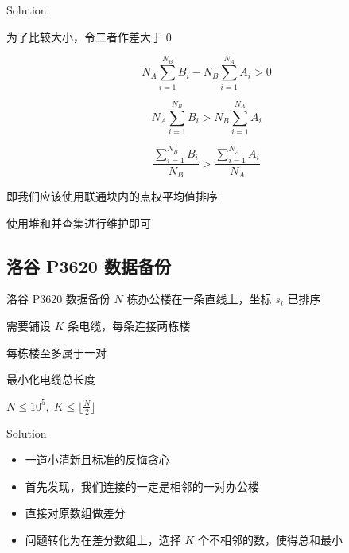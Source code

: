 ﻿\documentclass[aspectratio=169,handout]{ctexbeamer}
\begin{document}
\begin{frame}{Solution}
    

    为了比较大小，令二者作差大于 $ 0 $ 

    $$
        N_A\sum_{i=1}^{N_B}{B_i}-N_B\sum_{i=1}^{N_A}{A_i}>0
    $$

    $$
        N_A\sum_{i=1}^{N_B}{B_i}>N_B\sum_{i=1}^{N_A}{A_i} 
    $$

    $$
        \frac{\sum_{i=1}^{N_B}{B_i}}{N_B}>\frac{\sum_{i=1}^{N_A}{A_i}}{N_A}
    $$

    即我们应该使用联通块内的点权平均值排序

    使用堆和并查集进行维护即可

\end{frame}































\subsection{洛谷 P3620 数据备份}
\begin{frame}{洛谷 P3620 数据备份}
    $N$ 栋办公楼在一条直线上，坐标 $s_i$ 已排序

需要铺设 $K$ 条电缆，每条连接两栋楼

每栋楼至多属于一对

最小化电缆总长度

$N\leq 10^5,\; K\le\lfloor\frac{N}{2}\rfloor$
\end{frame}

\begin{frame}{Solution}
    \begin{itemize}
        \item 一道小清新且标准的反悔贪心
        \item 首先发现，我们连接的一定是相邻的一对办公楼
        \item 直接对原数组做差分
        \item 问题转化为在差分数组上，选择 $K$ 个不相邻的数，使得总和最小
    \end{itemize}
\end{frame}
\end{document}

